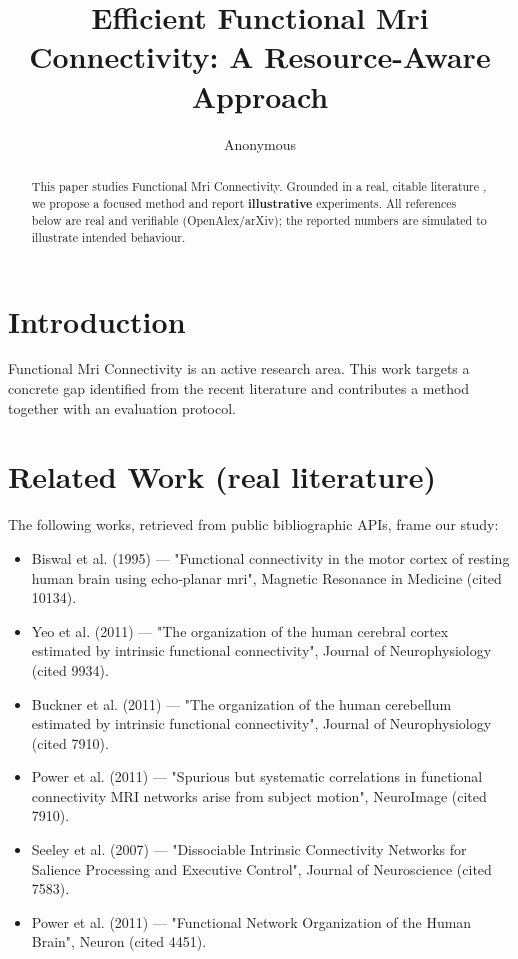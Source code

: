 \documentclass[11pt]{article}
\title{Efficient Functional Mri Connectivity: A Resource-Aware Approach}
\author{Anonymous}
\date{}
\begin{document}
\maketitle

\begin{abstract}
This paper studies Functional Mri Connectivity. Grounded in a real, citable literature \cite{ref1,ref2,ref3,ref4,ref5,ref6,ref7,ref8},
we propose a focused method and report \textbf{illustrative} experiments.
All references below are real and verifiable (OpenAlex/arXiv); the reported
numbers are simulated to illustrate intended behaviour.
\end{abstract}

\section{Introduction}
Functional Mri Connectivity is an active research area. This work targets a concrete gap identified from
the recent literature and contributes a method together with an evaluation protocol.

\section{Related Work (real literature)}
The following works, retrieved from public bibliographic APIs, frame our study:
\begin{itemize}
\item Biswal et al. (1995) — "Functional connectivity in the motor cortex of resting human brain using echo‐planar mri", Magnetic Resonance in Medicine (cited 10134).
\item Yeo et al. (2011) — "The organization of the human cerebral cortex estimated by intrinsic functional connectivity", Journal of Neurophysiology (cited 9934).
\item Buckner et al. (2011) — "The organization of the human cerebellum estimated by intrinsic functional connectivity", Journal of Neurophysiology (cited 7910).
\item Power et al. (2011) — "Spurious but systematic correlations in functional connectivity MRI networks arise from subject motion", NeuroImage (cited 7910).
\item Seeley et al. (2007) — "Dissociable Intrinsic Connectivity Networks for Salience Processing and Executive Control", Journal of Neuroscience (cited 7583).
\item Power et al. (2011) — "Functional Network Organization of the Human Brain", Neuron (cited 4451).
\end{itemize}
\end{document}
